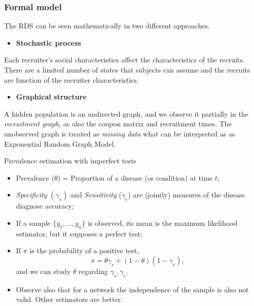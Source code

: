 \documentclass{beamer}
\newcommand{\Space}{\vspace{3ex}}
\begin{document}
\begin{frame}
  
  \frametitle{Formal model}

  The RDS can be seen mathematically in two different approaches. 

  \Space

  \begin{itemize}
    \item {\bf Stochastic process} \cite{heckathorn1997}
  \end{itemize}

  Each recruiter's social characteristics affect the characteristics of the
  recruits. There are a limited number of states that subjects can assume and
  the recruits are function of the recruiter characteristics.

  \Space

  \begin{itemize}
    \item {\bf Graphical structure} \cite{crawford2016}
  \end{itemize}

  A hidden population is an undirected graph, and we observe it partially in
  the {\em recruitment graph}, as also the coupon matrix and recruitment
  times. The unobserved graph is treated as {\em missing data} what can be
  interpreted as as Exponential Random Graph Model.  

\end{frame}

\begin{frame}{Prevalence estimation with imperfect tests}

  \begin{itemize}
    \item Prevalence ($\theta$) = Proportion of a disease (or condition) at time $t$;
    
    \item {\em Specificity} $(\gamma_s)$ and {\em Sensitivity} ($\gamma_e$) are (jointly) measures of
    the disease diagnose accuracy;

    \item If a sample $\{y_1, ..., y_n\}$ is observed, its mean is the maximum
    likelihood estimator, but it supposes a perfect test; 

    \item If $\pi$ is the probability of a positive test, 
    $$
    \pi = \theta\gamma_s + (1-\theta)(1-\gamma_e),
    $$
    and we can study $\theta$ regarding $\gamma_s, \gamma_e$. 

    \item Observe also that for a network the independence of the sample is
    also not valid. Other estimators are better. 

  \end{itemize}

\end{frame}
\end{document}
